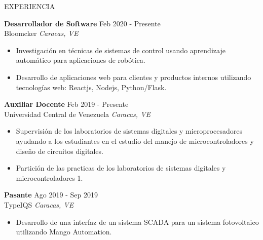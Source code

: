\documentclass{resume} %
\begin{document}
\begin{rSection}{EXPERIENCIA} %

    \textbf{Desarrollador de Software} \hfill Feb 2020 - Presente\\
    Bloomcker \hfill \textit{Caracas, VE}
    \begin{itemize}
        \item Investigación en técnicas de sistemas de control usando aprendizaje automático para aplicaciones de robótica.

        \item Desarrollo de aplicaciones web para clientes y productos internos utilizando tecnologías web: Reactjs, Nodejs, Python/Flask.
    \end{itemize}

    \textbf{Auxiliar Docente} \hfill Feb 2019 - Presente\\
    Universidad Central de Venezuela \hfill \textit{Caracas, VE}
    \begin{itemize}
        \item Supervisión de los laboratorios de sistemas digitales y microprocesadores ayudando a los estudiantes en el estudio del manejo de microcontroladores y diseño de circuitos digitales.

        \item Partición de las practicas de los laboratorios de sistemas digitales y microcontroladores 1.
    \end{itemize}

    \textbf{Pasante} \hfill Ago 2019 - Sep 2019\\
    TypeIQS \hfill \textit{Caracas, VE}
    \begin{itemize}
        \item Desarrollo de una interfaz de un sistema SCADA para un sistema fotovoltaico utilizando Mango Automation.
    \end{itemize}


\end{rSection}
\end{document}
